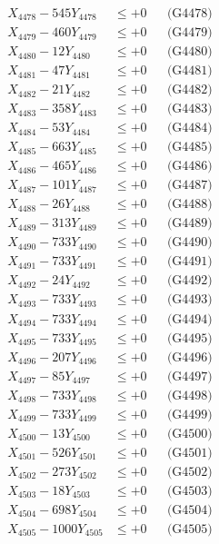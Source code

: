 \documentclass[a4paper,10pt]{article}
\begin{document}
{\begin{align}
X_{4478} - 545Y_{4478} &\leq +0 && \text{(G4478)} \\
X_{4479} - 460Y_{4479} &\leq +0 && \text{(G4479)} \\
X_{4480} - 12Y_{4480} &\leq +0 && \text{(G4480)} \\
\allowbreak
X_{4481} - 47Y_{4481} &\leq +0 && \text{(G4481)} \\
X_{4482} - 21Y_{4482} &\leq +0 && \text{(G4482)} \\
X_{4483} - 358Y_{4483} &\leq +0 && \text{(G4483)} \\
X_{4484} - 53Y_{4484} &\leq +0 && \text{(G4484)} \\
X_{4485} - 663Y_{4485} &\leq +0 && \text{(G4485)} \\
X_{4486} - 465Y_{4486} &\leq +0 && \text{(G4486)} \\
X_{4487} - 101Y_{4487} &\leq +0 && \text{(G4487)} \\
X_{4488} - 26Y_{4488} &\leq +0 && \text{(G4488)} \\
X_{4489} - 313Y_{4489} &\leq +0 && \text{(G4489)} \\
X_{4490} - 733Y_{4490} &\leq +0 && \text{(G4490)} \\
\allowbreak
X_{4491} - 733Y_{4491} &\leq +0 && \text{(G4491)} \\
X_{4492} - 24Y_{4492} &\leq +0 && \text{(G4492)} \\
X_{4493} - 733Y_{4493} &\leq +0 && \text{(G4493)} \\
X_{4494} - 733Y_{4494} &\leq +0 && \text{(G4494)} \\
X_{4495} - 733Y_{4495} &\leq +0 && \text{(G4495)} \\
X_{4496} - 207Y_{4496} &\leq +0 && \text{(G4496)} \\
X_{4497} - 85Y_{4497} &\leq +0 && \text{(G4497)} \\
X_{4498} - 733Y_{4498} &\leq +0 && \text{(G4498)} \\
X_{4499} - 733Y_{4499} &\leq +0 && \text{(G4499)} \\
X_{4500} - 13Y_{4500} &\leq +0 && \text{(G4500)} \\
\allowbreak
X_{4501} - 526Y_{4501} &\leq +0 && \text{(G4501)} \\
X_{4502} - 273Y_{4502} &\leq +0 && \text{(G4502)} \\
X_{4503} - 18Y_{4503} &\leq +0 && \text{(G4503)} \\
X_{4504} - 698Y_{4504} &\leq +0 && \text{(G4504)} \\
X_{4505} - 1000Y_{4505} &\leq +0 && \text{(G4505)} \\

\end{align}}
\end{document}
